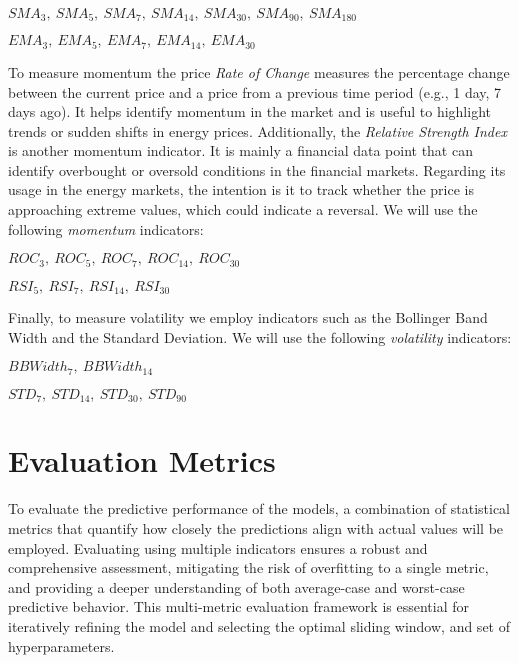 \documentclass[12pt]{report} %
\begin{document}
    $ SMA_{3},\ SMA_{5},\ SMA_{7},\ SMA_{14},\ SMA_{30},\ SMA_{90},\ SMA_{180} $
    
    $ EMA_{3},\ EMA_{5},\ EMA_{7},\ EMA_{14},\ EMA_{30}  $

To measure momentum the price \textit{Rate of Change} measures the percentage change between the current price and a price from a previous time period (e.g., 1 day, 7 days ago). It helps identify momentum in the market and is useful to highlight trends or sudden shifts in energy prices. Additionally, the \textit{Relative Strength Index} is another momentum indicator. It is mainly a financial data point that can identify overbought or oversold conditions in the financial markets. Regarding its usage in the energy markets, the intention is it to track whether the price is approaching extreme values, which could indicate a reversal. We will use the following \textit{momentum} indicators:

    $ ROC_{3},\ ROC_{5},\ ROC_{7},\ ROC_{14},\ ROC_{30} $
    
    $ RSI_{5},\ RSI_{7},\ RSI_{14},\ RSI_{30} $

Finally, to measure volatility we employ indicators such as the Bollinger Band Width and the Standard Deviation. 
We will use the following \textit{volatility} indicators:

    $ BBWidth_{7},\ BBWidth_{14} $
    
    $ STD_{7},\ STD_{14},\ STD_{30},\ STD_{90} $


\section{Evaluation Metrics}

To evaluate the predictive performance of the models, a combination of statistical metrics that quantify how closely the predictions align with actual values will be employed. Evaluating using multiple indicators ensures a robust and comprehensive assessment, mitigating the risk of overfitting to a single metric, and providing a deeper understanding of both average-case and worst-case predictive behavior. This multi-metric evaluation framework is essential for iteratively refining the model and selecting the optimal sliding window, and set of hyperparameters.
\end{document}
